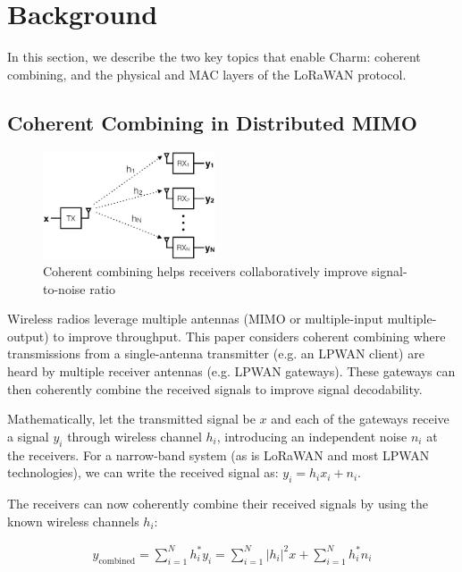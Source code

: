 \section{Background}
\label{sec:background}

In this section, we describe the two key topics that enable Charm: coherent
combining, and the physical and MAC layers of the LoRaWAN protocol.

\subsection{Coherent Combining in Distributed MIMO}
\label{sec:simo}

\begin{figure}[!bht]
    \centering
    \includegraphics[height=1.25in]{figures/SIMO_cropped}
    \vspace{-10pt}
    \caption{Coherent combining helps receivers collaboratively improve
        signal-to-noise ratio}
    \label{fig:simo}
    \compactimg
\end{figure}

Wireless radios leverage multiple antennas (MIMO or multiple-input
multiple-output) to improve throughput. This paper considers coherent
combining where transmissions from a single-antenna transmitter (e.g. an
LPWAN client) are heard by multiple receiver antennas (e.g. LPWAN gateways).
These gateways can then coherently combine the received signals to improve
signal decodability.

Mathematically, let the transmitted signal be $x$ and each of the gateways
receive a signal $y_i$ through wireless channel $h_i$, introducing an
independent noise $n_i$ at the receivers. For a narrow-band system (as is
LoRaWAN and most LPWAN technologies), we can write the received signal as:
$y_i = h_i x_i + n_i $.

The receivers can now coherently combine their received signals by using the
known wireless channels $h_i$:

\compactimg

\begin{align*}
y_{\text{combined}}
	= \sum_{i=1}^N h^*_i y_i
	= \sum_{i=1}^N \left| h_i \right|^2 x + \sum_{i=1}^N h^*_i n_i
\end{align*}

